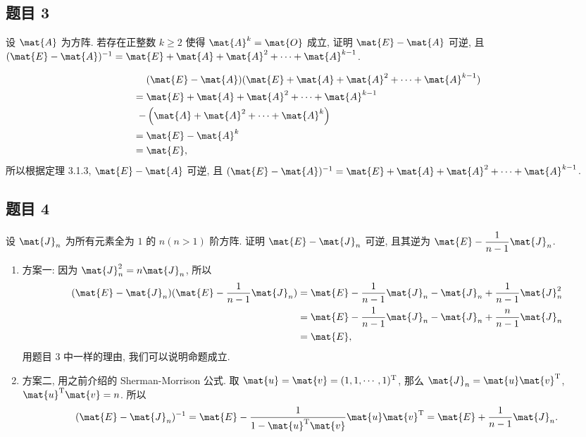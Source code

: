 \subsection*{题目 3}
\begin{problem}
设 $\mat{A}$ 为方阵. 若存在正整数 $k \geqslant 2$ 使得 $\mat{A}^k = \mat{O}$ 成立, 证明 $\mat{E} - \mat{A}$ 可逆, 且 $(\mat{E} - \mat{A})^{-1} = \mat{E} + \mat{A} + \mat{A}^2 + \cdots + \mat{A}^{k - 1}$.
\end{problem}
\begin{solution}
\[
\begin{aligned}
     {} & (\mat{E} - \mat{A})(\mat{E} + \mat{A} + \mat{A}^2 + \cdots + \mat{A}^{k - 1}) \\
    ={} & \mat{E} + \mat{A} + \mat{A}^2 + \cdots + \mat{A}^{k - 1} \\
    -{} & \left(\mat{A} + \mat{A}^2 + \cdots + \mat{A}^{k}\right) \\
    ={} & \mat{E} - \mat{A}^k \\
    ={} & \mat{E},
\end{aligned}
\]
所以根据定理 3.1.3, $\mat{E} - \mat{A}$ 可逆, 且 $(\mat{E} - \mat{A})^{-1} = \mat{E} + \mat{A} + \mat{A}^2 + \cdots + \mat{A}^{k - 1}$.
\end{solution}

\subsection*{题目 4}
\begin{problem}
设 $\mat{J}_n$ 为所有元素全为 $1$ 的 $n(n > 1)$ 阶方阵. 证明 $\mat{E} - \mat{J}_n$ 可逆, 且其逆为 $\mat{E} - \dfrac{1}{n - 1}\mat{J}_n$.
\end{problem}
\begin{solution}
\begin{enumerate}
    \item 方案一: 因为 $\mat{J}_n^2 = n\mat{J}_n$, 所以
    \[
    \begin{aligned}
        (\mat{E} - \mat{J}_n)(\mat{E} - \dfrac{1}{n - 1}\mat{J}_n) 
        ={} & \mat{E} - \dfrac{1}{n - 1}\mat{J}_n - \mat{J}_n + \dfrac{1}{n - 1}\mat{J}_n^2 \\
        ={} & \mat{E} - \dfrac{1}{n - 1}\mat{J}_n - \mat{J}_n + \dfrac{n}{n - 1}\mat{J}_n \\
        ={} & \mat{E},
    \end{aligned}
    \]
    用题目 3 中一样的理由, 我们可以说明命题成立.
    \item 方案二, 用之前介绍的 Sherman-Morrison 公式. 取 $\mat{u} = \mat{v} = (1, 1, \cdots, 1)^{\mathrm{T}}$, 那么 $\mat{J}_n = \mat{u}\mat{v}^{\mathrm{T}}$, $\mat{u}^{\mathrm{T}}\mat{v} = n$. 所以
    \[
        (\mat{E} - \mat{J}_n)^{-1} = \mat{E} - \frac{1}{1 - \mat{u}^{\mathrm{T}}\mat{v}}\mat{u}\mat{v}^{\mathrm{T}} = \mat{E} + \frac{1}{n - 1}\mat{J}_n.
    \]
\end{enumerate}
\end{solution}

